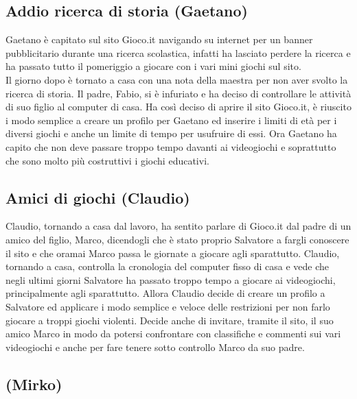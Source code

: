 \documentclass[../Report.tex]{subfiles}
\begin{document}
    \subsection{Addio ricerca di storia (Gaetano)}
    Gaetano è capitato sul sito Gioco.it navigando su internet per un banner pubblicitario durante una ricerca scolastica, infatti ha lasciato perdere la ricerca e ha passato tutto il pomeriggio a giocare con i vari mini giochi sul sito.\\
    Il giorno dopo è tornato a casa con una nota della maestra per non aver svolto la ricerca di storia. Il padre, Fabio, si è infuriato e ha deciso di controllare le attività di suo figlio al computer di casa. Ha così deciso di aprire il sito Gioco.it, è riuscito i modo semplice a creare un profilo per Gaetano ed inserire i limiti di età per i diversi giochi e anche un limite di tempo per usufruire di essi. Ora Gaetano ha capito che non deve passare troppo tempo davanti ai videogiochi e soprattutto che sono molto più costruttivi i giochi educativi.

    \subsection{Amici di giochi (Claudio)}
    Claudio, tornando a casa dal lavoro, ha sentito parlare di Gioco.it dal padre di un amico del figlio, Marco, dicendogli che è stato proprio Salvatore a fargli conoscere il sito e che oramai Marco passa le giornate a giocare agli sparattutto. Claudio, tornando a casa, controlla la cronologia del computer fisso di casa e vede che negli ultimi giorni Salvatore ha passato troppo tempo a giocare ai videogiochi, principalmente agli sparattutto. Allora Claudio decide di creare un profilo a Salvatore ed applicare i modo semplice e veloce delle restrizioni per non farlo giocare a troppi giochi violenti. Decide anche di invitare, tramite il sito, il suo amico Marco in modo da potersi confrontare con classifiche e commenti sui vari videogiochi e anche per fare tenere sotto controllo Marco da suo padre.

    \subsection{(Mirko)}
\end{document}
